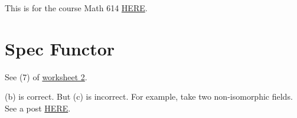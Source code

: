 This is for the course Math 614 \href{https://dept.math.lsa.umich.edu/~kesmith/Math614.html}{HERE}.

\section{Spec Functor}

See (7) of \href{https://dept.math.lsa.umich.edu/~kesmith/SpectrumWorksheet.pdf}{worksheet 2}.

(b) is correct. But (c) is incorrect. For example, take two non-isomorphic fields. See a post \href{https://math.stackexchange.com/questions/4650843/rings-are-isomorphic-iff-prime-spectrums-are-homeomorphic}{HERE}.
